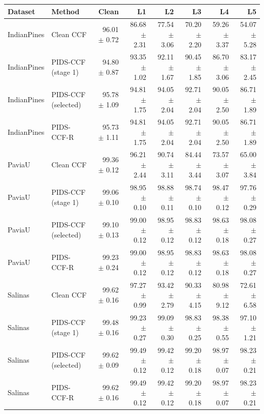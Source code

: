 \begin{tabular}{llrrrrrr}
\hline
Dataset & Method & Clean & L1 & L2 & L3 & L4 & L5 \\
\hline
IndianPines & Clean CCF & 96.01 $\pm$ 0.72 & 86.68 $\pm$ 2.31 & 77.54 $\pm$ 3.06 & 70.20 $\pm$ 2.20 & 59.26 $\pm$ 3.37 & 54.07 $\pm$ 5.28 \\
IndianPines & PIDS-CCF (stage 1) & 94.80 $\pm$ 0.87 & 93.35 $\pm$ 1.02 & 92.11 $\pm$ 1.67 & 90.45 $\pm$ 1.85 & 86.70 $\pm$ 3.06 & 83.17 $\pm$ 2.45 \\
IndianPines & PIDS-CCF (selected) & 95.78 $\pm$ 1.09 & 94.81 $\pm$ 1.75 & 94.05 $\pm$ 2.04 & 92.71 $\pm$ 2.04 & 90.05 $\pm$ 2.50 & 86.71 $\pm$ 1.89 \\
IndianPines & PIDS-CCF-R & 95.73 $\pm$ 1.11 & 94.81 $\pm$ 1.75 & 94.05 $\pm$ 2.04 & 92.71 $\pm$ 2.04 & 90.05 $\pm$ 2.50 & 86.71 $\pm$ 1.89 \\
\hline
PaviaU & Clean CCF & 99.36 $\pm$ 0.12 & 96.21 $\pm$ 2.44 & 90.74 $\pm$ 3.11 & 84.44 $\pm$ 3.44 & 73.57 $\pm$ 3.07 & 65.00 $\pm$ 3.84 \\
PaviaU & PIDS-CCF (stage 1) & 99.06 $\pm$ 0.10 & 98.95 $\pm$ 0.10 & 98.88 $\pm$ 0.11 & 98.74 $\pm$ 0.10 & 98.47 $\pm$ 0.12 & 97.76 $\pm$ 0.29 \\
PaviaU & PIDS-CCF (selected) & 99.10 $\pm$ 0.13 & 99.00 $\pm$ 0.12 & 98.95 $\pm$ 0.12 & 98.83 $\pm$ 0.12 & 98.63 $\pm$ 0.18 & 98.08 $\pm$ 0.27 \\
PaviaU & PIDS-CCF-R & 99.23 $\pm$ 0.24 & 99.00 $\pm$ 0.12 & 98.95 $\pm$ 0.12 & 98.83 $\pm$ 0.12 & 98.63 $\pm$ 0.18 & 98.08 $\pm$ 0.27 \\
\hline
Salinas & Clean CCF & 99.62 $\pm$ 0.16 & 97.27 $\pm$ 0.99 & 93.42 $\pm$ 2.79 & 90.33 $\pm$ 4.15 & 80.98 $\pm$ 9.12 & 72.61 $\pm$ 6.58 \\
Salinas & PIDS-CCF (stage 1) & 99.48 $\pm$ 0.16 & 99.23 $\pm$ 0.27 & 99.09 $\pm$ 0.30 & 98.83 $\pm$ 0.25 & 98.38 $\pm$ 0.55 & 97.10 $\pm$ 1.21 \\
Salinas & PIDS-CCF (selected) & 99.62 $\pm$ 0.09 & 99.49 $\pm$ 0.12 & 99.42 $\pm$ 0.12 & 99.20 $\pm$ 0.18 & 98.97 $\pm$ 0.07 & 98.23 $\pm$ 0.21 \\
Salinas & PIDS-CCF-R & 99.62 $\pm$ 0.16 & 99.49 $\pm$ 0.12 & 99.42 $\pm$ 0.12 & 99.20 $\pm$ 0.18 & 98.97 $\pm$ 0.07 & 98.23 $\pm$ 0.21 \\
\hline
\end{tabular}
